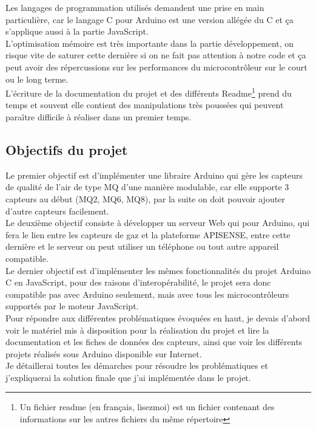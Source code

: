 Les langages de programmation utilisés demandent une prise en main particulière, car le langage C pour Arduino est une version allégée du C et ça s'applique aussi à la partie JavaScript.\\

L'optimisation mémoire est très importante dans la partie développement, on risque vite de saturer cette dernière si on ne fait pas attention à notre code et ça peut avoir des répercussions sur les performances du microcontrôleur sur le court ou le long terme.\\

L’écriture de la documentation du projet et des différents Readme\footnote{Un fichier readme (en français, lisezmoi) est un fichier contenant des informations sur les autres fichiers du même répertoire} prend du temps et souvent elle contient des manipulations très poussées qui peuvent paraître difficile à réaliser dans un premier temps.\\


\subsection{Objectifs du projet}
Le premier objectif est d’implémenter une libraire Arduino qui gère les capteurs de qualité de l’air de type MQ d’une manière modulable, car elle supporte 3 capteurs au début (MQ2, MQ6, MQ8), par la suite on doit pouvoir ajouter d’autre capteurs facilement.\\
Le deuxième objectif consiste à développer un serveur Web qui pour Arduino, qui fera le lien entre les capteurs de gaz et la plateforme APISENSE, entre cette dernière et le serveur on peut utiliser un téléphone ou tout autre appareil compatible.\\ 
Le dernier objectif est d'implémenter les mêmes fonctionnalités du projet Arduino C en JavaScript, pour des raisons d'interopérabilité, le projet sera donc compatible pas avec Arduino seulement, mais avec tous les microcontrôleurs supportés par le moteur JavaScript.\\
Pour répondre aux différentes problématiques évoquées en haut, je devais d'abord voir le matériel mis à disposition pour la réalisation du projet et lire la documentation et les fiches de données des capteurs, ainsi que voir les différents projets réalisés sous Arduino disponible sur Internet.\\
Je détaillerai toutes les démarches pour résoudre les problématiques et j'expliquerai la solution finale que j’ai implémentée dans le projet.

\newpage
